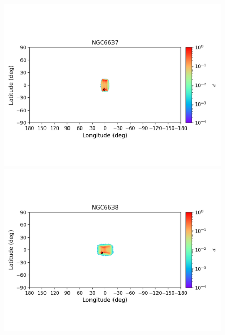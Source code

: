         \begin{figure}
            \begin{center}
                \includegraphics[clip=true, trim = 0mm 20mm 0mm 10mm, width=1\columnwidth]{images/error_plots_NGC6637.png}
                \includegraphics[clip=true, trim = 0mm 20mm 0mm 10mm, width=1\columnwidth]{images/error_plots_NGC6638.png}
                

\end{center}
\end{figure}
